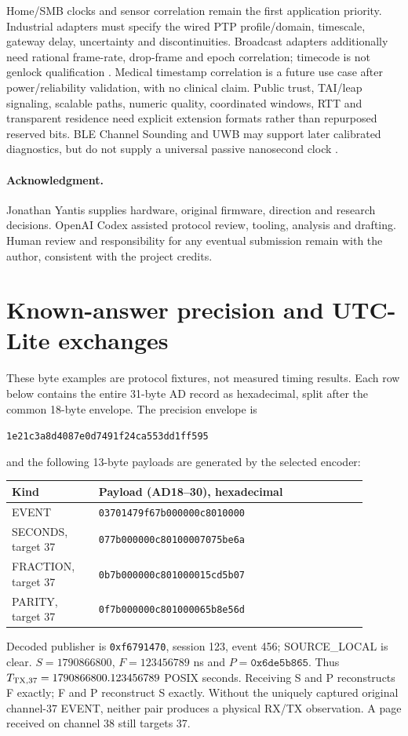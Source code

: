 \documentclass[11pt,letterpaper]{article}
\newcommand{\page}{\clearpage}
\newcommand{\hex}[1]{\texttt{#1}}
\begin{document}
Home/SMB clocks and sensor correlation remain the first application priority. Industrial adapters must specify the wired PTP profile/domain, timescale, gateway delay, uncertainty and discontinuities. Broadcast adapters additionally need rational frame-rate, drop-frame and epoch correlation; timecode is not genlock qualification \cite{ptp,smpte}. Medical timestamp correlation is a future use case after power/reliability validation, with no clinical claim. Public trust, TAI/leap signaling, scalable paths, numeric quality, coordinated windows, RTT and transparent residence need explicit extension formats rather than repurposed reserved bits. BLE Channel Sounding and UWB may support later calibrated diagnostics, but do not supply a universal passive nanosecond clock \cite{cs,uwb}.

\paragraph{Acknowledgment.} Jonathan Yantis supplies hardware, original firmware, direction and research decisions. OpenAI Codex assisted protocol review, tooling, analysis and drafting. Human review and responsibility for any eventual submission remain with the author, consistent with the project credits.

\page
\appendix
\section{Known-answer precision and UTC-Lite exchanges}\label{sec:examples}
These byte examples are protocol fixtures, not measured timing results. Each row below contains the entire 31-byte AD record as hexadecimal, split after the common 18-byte envelope. The precision envelope is
\begin{center}\small\texttt{1e21c3a8d4087e0d7491f24ca553dd1ff595}\end{center}
and the following 13-byte payloads are generated by the selected encoder:
\begin{center}\small
\begin{tabular}{@{}L{0.22\linewidth}L{0.68\linewidth}@{}}\toprule
Kind & Payload (AD18--30), hexadecimal \\\midrule
EVENT & \texttt{03701479f67b000000c8010000} \\
SECONDS, target 37 & \texttt{077b000000c80100007075be6a} \\
FRACTION, target 37 & \texttt{0b7b000000c801000015cd5b07} \\
PARITY, target 37 & \texttt{0f7b000000c801000065b8e56d} \\\bottomrule
\end{tabular}
\end{center}
Decoded publisher is \hex{0xf6791470}, session 123, event 456; SOURCE\_LOCAL is clear. $S=1790866800$, $F=123456789$ ns and $P=\hex{0x6de5b865}$. Thus $T_{{\rm TX},37}=1790866800.123456789$ POSIX seconds. Receiving S and P reconstructs F exactly; F and P reconstruct S exactly. Without the uniquely captured original channel-37 EVENT, neither pair produces a physical RX/TX observation. A page received on channel 38 still targets 37.
\end{document}
